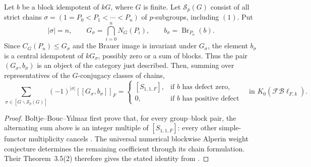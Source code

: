 \begin{corollary}\label{cor:functorial-awc}
Let $b$ be a block idempotent of $kG$, where $G$ is finite. Let
$\mathcal S_p(G)$ consist of all strict chains
$\sigma=(1=P_0<P_1<\cdots<P_n)$ of $p$-subgroups, including $(1)$.
Put
\[
 |\sigma|=n,\qquad
 G_\sigma=\bigcap_{i=0}^nN_G(P_i),\qquad
 b_\sigma=\operatorname{Br}_{P_n}(b).
\]
Since $C_G(P_n)\leq G_\sigma$ and the Brauer image is invariant
under $G_\sigma$, the element $b_\sigma$ is a central idempotent
of $kG_\sigma$, possibly zero or a sum of blocks. Thus the pair
$(G_\sigma,b_\sigma)$ is an object of the category just described.
Then, summing over representatives of the $G$-conjugacy classes of chains,
\[
 \sum_{\sigma\in[G\backslash\mathcal S_p(G)]}
 (-1)^{|\sigma|}[[G_\sigma,b_\sigma]]_F
 =\begin{cases}
 [S_{1,1,F}],&\text{if $b$ has defect zero},\\
 0,&\text{if $b$ has positive defect}
 \end{cases}
 \quad\text{in }K_0(\mathcal F\mathcal B\ell_{F,k}).
\]
\end{corollary}

\begin{proof}
Boltje--Bouc--Y\i lmaz first prove that, for every group--block pair,
the alternating sum above is an integer multiple of $[S_{1,1,F}]$:
every other simple-functor multiplicity cancels
\cite[Theorem~3.5\textup{(1)}]{BBY2026}. The universal numerical
blockwise Alperin weight conjecture determines the remaining coefficient
through its chain formulation. Their Theorem~3.5\textup{(2)} therefore
gives the stated identity from .
\end{proof}

